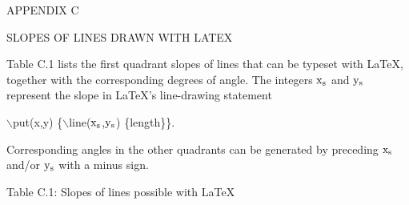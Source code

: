 
  \nofiles                          
  \def\LATEX{\LaTeX}
  \let\TEX = \TeX               
  \setcounter{totalnumber}{5}   
  \setcounter{topnumber}{3}     
  \setcounter{bottomnumber}{3}
  \setlength{\oddsidemargin}{3.9cm}     %
  \setlength{\textwidth}{5.7in}         %
  \setlength{\topmargin}{1cm}
  \setlength{\headheight}{.6cm}
  \setlength{\textheight}{8.5in}
  \renewcommand{\baselinestretch}{1.5}
  \setlength{\parindent}{1cm}
  \raggedbottom
  \setlength{\itemsep}{-2mm}
  
      
  \setcounter{page}{120}
  \initial
 
 \centerline{APPENDIX C}
 \vspace{4mm}
 \centerline{SLOPES OF LINES DRAWN WITH LATEX}
 \vspace{4mm}

 Table C.1 lists the first quadrant slopes of lines that can be
 typeset with LaTeX, together with the corresponding degrees of
 angle. The integers ${\rm x_s}$ and ${\rm y_s}$ represent the 
 slope in LaTeX's line-drawing statement \\ 
 \centerline{$\backslash $put(x,y) \{$\backslash $line(${\rm x_s}$,${\rm y_s}$)
\{length\}\}. } Corresponding angles in the other quadrants can be
 generated by preceding ${\rm x_s}$ and/or ${\rm y_s}$ with 
 a minus sign.

 \centerline{Table C.1: Slopes of lines possible with LaTeX}
 
